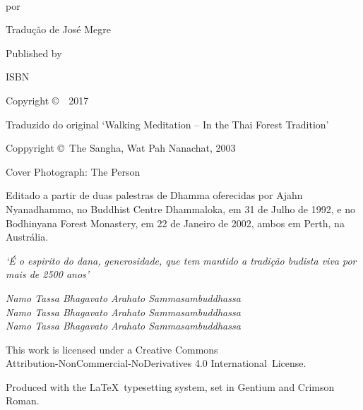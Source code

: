 \cleartoverso
\thispagestyle{empty}

{\copyrightsize
\centering
\setlength{\parindent}{0pt}%
\setlength{\parskip}{0.8\baselineskip}%

\thetitle\\
por \theauthor

Tradução de José Megre

Published by \thePublisher

ISBN \theISBN

Copyright \copyright\ \thePublisher\ 2017

Traduzido do original `Walking Meditation -- In the Thai Forest Tradition'

Coppyright \copyright\ The Sangha, Wat Pah Nanachat, 2003

Cover Photograph: The Person

Editado a partir de duas palestras de Dhamma oferecidas por
Ajahn Nyanadhammo, no Buddhist Centre Dhammaloka, em 31 de Julho de
1992, e no Bodhinyana Forest Monastery, em 22 de Janeiro de 2002, ambos
em Perth, na Austrália.

\emph{`É o espirito do dana, generosidade, que tem mantido a tradição
budista viva por mais de 2500 anos'}

\emph{Namo Tassa Bhagavato Arahato Sammasambuddhassa}\\
\emph{Namo Tassa Bhagavato Arahato Sammasambuddhassa}\\
\emph{Namo Tassa Bhagavato Arahato Sammasambuddhassa}

\vfill

{\footnotesize

This work is licensed under a Creative Commons\\
Attribution-NonCommercial-NoDerivatives 4.0 International~License.

Produced with the \LaTeX\ typesetting system, set in Gentium and Crimson Roman.

\theEditionInfo

}}

